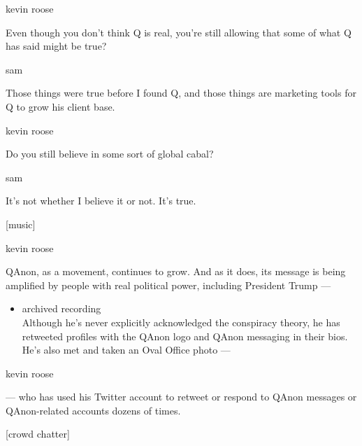 kevin roose

Even though you don't think Q is real, you're still allowing that some
of what Q has said might be true?

sam

Those things were true before I found Q, and those things are marketing
tools for Q to grow his client base.

kevin roose

Do you still believe in some sort of global cabal?

sam

It's not whether I believe it or not. It's true.

{[}music{]}

kevin roose

QAnon, as a movement, continues to grow. And as it does, its message is
being amplified by people with real political power, including President
Trump ---

\begin{itemize}
\tightlist
\item
  archived recording\\
  Although he's never explicitly acknowledged the conspiracy theory, he
  has retweeted profiles with the QAnon logo and QAnon messaging in
  their bios. He's also met and taken an Oval Office photo ---
\end{itemize}

kevin roose

--- who has used his Twitter account to retweet or respond to QAnon
messages or QAnon-related accounts dozens of times.

{[}crowd chatter{]}

